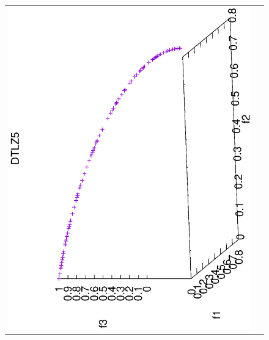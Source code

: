 \begin{figure}[H]
\begin{tabular}{cc}
 \includegraphics[scale=0.3, angle=-90,origin=c]{Figures_Chapter7/Results_Chapter4/Summary_Representative/VSD-MOEA-D/DTLZ5.eps} \\

\end{tabular}
\end{figure}
